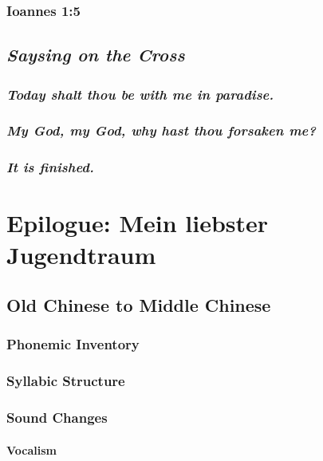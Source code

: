 \documentclass{report}[12pt]
\begin{document}
\subsection{Ioannes 1:5}

\section{\emph{Saysing on the Cross}}

\subsection{\emph{Today shalt thou be with me in paradise.}}

\subsection{\emph{My God, my God, why hast thou forsaken me?}}

\subsection{\emph{It is finished.}}

\chapter*{Epilogue: Mein liebster Jugendtraum}

\section*{Old Chinese to Middle Chinese}

\subsection*{Phonemic Inventory}

\subsection*{Syllabic Structure}

\subsection*{Sound Changes}

\subsubsection*{Vocalism}
\end{document}
